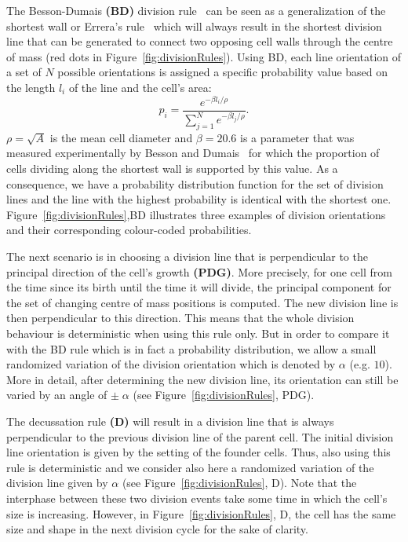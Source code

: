 \documentclass[11pt,a4paper, draft]{article}
\begin{document}
The Besson-Dumais \textbf{(BD)} division rule~\cite{besson_and_dumais_2011} can be seen as a generalization of the shortest wall or Errera's rule~\cite{errera_1886} which will always result in the shortest division line that can be generated to connect two opposing cell walls through the centre of mass (red dots in Figure~\ref{fig:divisionRules}). Using BD, each line orientation of a set of $N$ possible orientations is assigned a specific probability value based on the length $l_i$ of the line and the cell's area:
\begin{equation}
p_i = \frac{e^{-\beta l_i / \rho}}{\sum_{j=1}^{N} e^{-\beta l_j / \rho}}.
\end{equation}
$\rho = \sqrt{A}$ is the mean cell diameter and $\beta = 20.6$ is a parameter that was measured experimentally by Besson and Dumais~\cite{besson_and_dumais_2011} for which the proportion of cells dividing along the shortest wall is supported by this value. As a consequence, we have a probability distribution function for the set of division lines and the line with the highest probability is identical with the shortest one. Figure~\ref{fig:divisionRules},BD illustrates three examples of division orientations and their corresponding colour-coded probabilities.

The next scenario is in choosing a division line that is perpendicular to the principal direction of the cell's growth \textbf{(PDG)}. More precisely, for one cell from the time since its birth until the time it will divide, the principal component for the set of changing centre of mass positions is computed. The new division line is then perpendicular to this direction. This means that the whole division behaviour is deterministic when using this rule only. But in order to compare it with the BD rule which is in fact a probability distribution, we allow a small randomized variation of the division orientation which is denoted by $\alpha$ (e.g. $10$). More in detail, after determining the new division line, its orientation can still be varied by an angle of $\pm \; \alpha$ (see Figure~\ref{fig:divisionRules}, PDG).

The decussation rule \textbf{(D)} will result in a division line that is always perpendicular to the previous division line of the parent cell. The initial division line orientation is given by the setting of the founder cells. Thus, also using this rule is deterministic and we consider also here a randomized variation of the division line given by $\alpha$ (see Figure~\ref{fig:divisionRules}, D). Note that the interphase between these two division events take some time in which the cell's size is increasing. However, in Figure~\ref{fig:divisionRules}, D, the cell has the same size and shape in the next division cycle for the sake of clarity.
\end{document}
